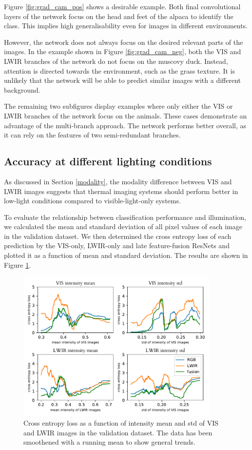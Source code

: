 \documentclass{l4proj}
\begin{document}
Figure \ref{fig:grad_cam_pos} shows a desirable example. Both final convolutional layers of the network focus on the head and feet of the alpaca to identify the class. This implies high generalisability even for images in different environments.

However, the network does not always focus on the desired relevant parts of the images. In the example shown in Figure \ref{fig:grad_cam_neg}, both the VIS and LWIR branches of the network do not focus on the muscovy duck. Instead, attention is directed towards the environment, such as the grass texture. It is unlikely that the network will be able to predict similar images with a different background.

The remaining two subfigures display examples where only either the VIS or LWIR branches of the network focus on the animals. These cases demonstrate an advantage of the multi-branch approach. The network performs better overall, as it can rely on the features of two semi-redundant branches.


\subsection{Accuracy at different lighting conditions}

As discussed in Section \ref{modality}, the modality difference between VIS and LWIR images suggests that thermal imaging systems should perform better in low-light conditions compared to visible-light-only systems.

To evaluate the relationship between classification performance and illumination, we calculated the mean and standard deviation of all pixel values of each image in the validation dataset. We then determined the cross entropy loss of each prediction by the VIS-only, LWIR-only and late feature-fusion ResNets and plotted it as a function of mean and standard deviation. The results are shown in Figure \ref{fig:illumination}.

\begin{figure}[ht]
  \centering
  \includegraphics[width=0.9\textwidth]{images/evaluation/illumination}
  \caption{Cross entropy loss as a function of intensity mean and std of VIS and LWIR images in the validation dataset. The data has been smoothened with a running mean to show general trends.}
  \label{fig:illumination}
\end{figure}
\end{document}

